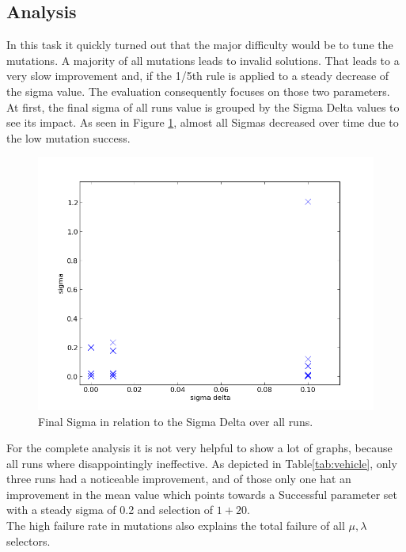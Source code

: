 \documentclass{scrartcl}
\begin{document}
\subsection{Analysis}
In this task it quickly turned out that the major difficulty would be to tune the mutations. A majority of all mutations leads to invalid solutions. That leads to a very slow improvement and, if the 1/5th rule is applied to a steady decrease of the sigma value. The evaluation consequently focuses on those two parameters.\\
At first, the final sigma of all runs value is grouped by the Sigma Delta values to see its impact. As seen in Figure \ref{fig:sigmas}, almost all Sigmas decreased over time due to the low mutation success.

\begin{figure}
 \center
 \includegraphics[width=.5\linewidth]{img/ex4/sigmas.png}
 \caption{Final Sigma in relation to the Sigma Delta over all runs.}
 \label{fig:sigmas}
\end{figure}

For the complete analysis it is not very helpful to show a lot of graphs, because all runs where disappointingly ineffective. As depicted in Table\ref{tab:vehicle}, only three runs had a noticeable improvement, and of those only one hat an improvement in the mean value which points towards a Successful parameter set with a steady sigma of 0.2 and selection of $1+20$.\\ The high failure rate in mutations also explains the total failure of all $\mu, \lambda$ selectors.
\end{document}

